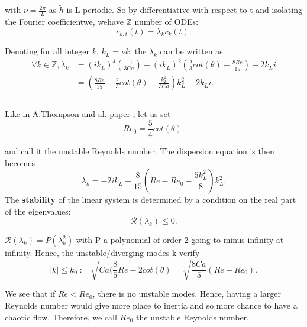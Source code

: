 \documentclass[12pt]{article}
\begin{document}
 with $\nu =\frac{2\pi}{L}$ as $\tilde{h}$ is L-periodic. So by differentiative with respect to t and isolating the Fourier coefficientwe,  
wehave $\mathbb{Z}$ number of ODEs: 
\begin{equation}\label{Fourier_mode}
    c_{k, t}(t) = \lambda_k c_k(t).
\end{equation}

Denoting for all integer $k$, $k_L = \nu k$, the $\lambda_k$ can be written as 
\begin{equation*}
\begin{aligned}
    \forall k\in \mathbb{Z}, \lambda_k &= (ik_L)^4(\frac{-1}{3Ca})+(ik_L)^2(\frac{2}{3}cot(\theta)-\frac{8Re}{15})-2k_Li \\
    &= (\frac{8Re}{15}-\frac{2}{3}cot(\theta) -\frac{k_L^2}{3Ca})k_L^2 - 2k_Li. \\ \\
\end{aligned}
\end{equation*}

Like in A.Thompson and al. paper \cite{Thompson_2016_prop_ctrl}, let us set 
\begin{equation}\label{eq:unstable_Re}
    \boxed{
    Re_0 = \frac{5}{4}cot(\theta).}
\end{equation}

and call it the unstable Reynolds number. The dispersion equation is then becomes
\begin{equation}\label{dispersion_relation}
\boxed{
    \lambda_k = -2ik_L+ \frac{8}{15}\left( Re-Re_0-\frac{5k_L^2}{8}\right)k_L^2.
}
\end{equation}
The \textbf{stability} of the linear system is determined by a condition on the real part of the eigenvalues: $$\mathcal{R}(\lambda_k)\leq0.$$

$\mathcal{R}(\lambda_k) = P(\lambda_k^2)$ with P a polynomial of order 2 going to minus infinity at infinity. Hence, the unstable/diverging modes k verify 
\begin{equation}\label{eq:k_0_critical_wave_number}
|k|\leq k_0 := \sqrt{Ca(\frac{8}{5}Re-2cot(\theta)} = \sqrt{\frac{8Ca}{5}(Re-Re_0)}.
\end{equation}

We see that if $Re<Re_0$, there is no unstable modes. Hence, having a larger Reynolds number would give more place to inertia and so more chance to have a chaotic flow. Therefore, we call $Re_0$ the unstable Reynolds number.

\newpage
\end{document}
